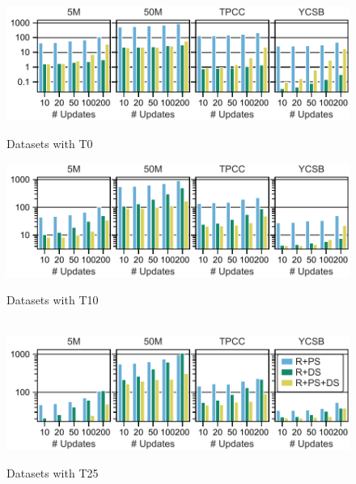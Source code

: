 \begin{figure}[t]
\begin{minipage}[b]{0.48\linewidth}
    \includegraphics[width=1\linewidth,trim=0 0 0 0, clip]{imgs/felix_t0_optimizations.pdf}\\
    \vspace{-8mm}
  \caption{Datasets with T0}
  \label{fig:Relation Size}
  \end{minipage}
 \begin{minipage}[b]{0.48\linewidth}
    \includegraphics[width=1\linewidth,trim=0 0 0 0, clip]{imgs/felix_t10_optimizations.pdf}\\
    \vspace{-8mm}
  \caption{Datasets with T10}
  \label{fig:Relation Size1}
  \end{minipage}
\end{figure}
\begin{figure}
  \begin{minipage}[b]{1\linewidth}
    $\,$\\[-5mm]
    \includegraphics[width=1\linewidth,trim=0 0 0 0, clip]{imgs/felix_t25_optimizations.pdf}\\
    \vspace{-8mm}
  \caption{Datasets with T25}
  \label{fig:Relation Size2}
  \end{minipage}
% 
% 
% 
% 
% 
% 
% 
\end{figure}


